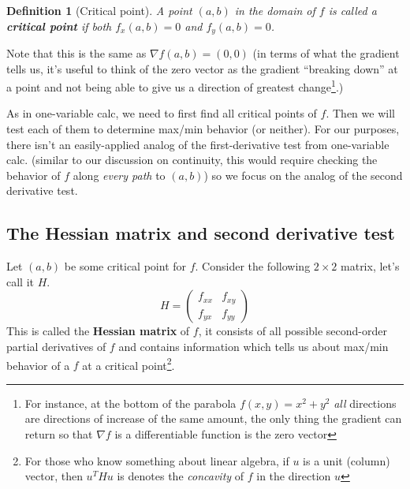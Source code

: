 \documentclass[12pt]{article}
\numberwithin{equation}{subsection}
\numberwithin{figure}{subsection}
\newtheorem{defn}[subsection]{Definition}
\theoremstyle{note}
\begin{document}
{\begin{defn}[Critical point] A point $(a,b)$ in the domain of $f$ is called a \textbf{critical point} if both $f_x(a,b)=0$ and $f_y(a,b)=0$. 
\end{defn}

Note that this is the same as $\nabla f(a,b)=(0,0)$ (in terms of what the gradient tells us, it's useful to think of the zero vector as the gradient ``breaking down'' at a point and not being able to give us a direction of greatest change\footnote{For instance, at the bottom of the parabola $f(x,y)=x^2+y^2$ \textit{all} directions are directions of increase of the same amount, the only thing the gradient can return so that $\nabla f$ is a differentiable function is the zero vector}.) 

As in one-variable calc, we need to first find all critical points of $f$. Then we will test each of them to determine max/min behavior (or neither). For our purposes, there isn't an easily-applied analog of the first-derivative test from one-variable calc. (similar to our discussion on continuity, this would require checking the behavior of $f$ along \textit{every path} to $(a,b)$) so we focus on the analog of the second derivative test. 



\subsection{The Hessian matrix and second derivative test}
Let $(a,b)$ be some critical point for $f$. Consider the following $2\times 2$ matrix, let's call it $H$. \begin{equation} \label{Hessian} H=\begin{pmatrix} f_{xx} & f_{xy} \\ f_{yx} & f_{yy} \end{pmatrix} \end{equation}
This is called the \textbf{Hessian matrix} of $f$, it consists of all possible second-order partial derivatives of $f$ and contains information which tells us about max/min behavior of a $f$ at a critical point\footnote{For those who know something about linear algebra, if $u$ is a unit (column) vector, then $u^T H u$ is denotes the \textit{concavity} of $f$ in the direction $u$}.

}
\end{document}
